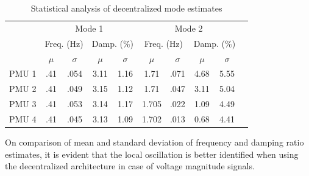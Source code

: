 \documentclass[conference]{IEEEtran}
\renewcommand\footnoterule{\vspace*{-3pt}%
     \hrule width 2in height 0.4pt
     \vspace*{2.6pt}}
\begin{document}
\begin{table}[!b]
\renewcommand{\arraystretch}{1.2}
%
\caption{Statistical analysis of  decentralized mode estimates}
\label{tab:result_decentral}
\noindent
\centering
    \begin{minipage}{\linewidth} %
    \renewcommand\footnoterule{\vspace*{-5pt}} %
    \begin{center}
        \begin{tabular}{c c c c c c c c c c}
            \toprule
            \multirow{2}{*}{} & \multicolumn{4}{c}{Mode 1 }& \multicolumn{4}{c}{Mode 2}\\
            \cline{2-9}
            \multirow{2}{*}{PMU ID} & \multicolumn{2}{c}{Freq. (Hz)}& \multicolumn{2}{c}{Damp. (\%)} & \multicolumn{2}{c}{Freq. (Hz)}& \multicolumn{2}{c}{Damp. (\%)}\\
            \cline{2-9}
             & $\mu $ & $\sigma $  & $\mu $ & $\sigma $ & $\mu $ & $\sigma $ & $\mu $ & $\sigma $\\
            \midrule
            PMU 1 & .41  & .054 & 3.11 & 1.16 & 1.71 & .071 & 4.68 & 5.55\\
            PMU 2 & .41  & .049 & 3.15 & 1.12 & 1.71 & .047 & 3.11 & 5.04\\
            PMU 3 & .41  & .053 & 3.14 & 1.17 & 1.705 &.022 & 1.09 & 4.49\\
            PMU 4 & .41  & .045 & 3.13 & 1.09 & 1.702 & .013 & 0.68 & 4.41\\
            
            \bottomrule
        \end{tabular}
        \end{center}
    \end{minipage}
\end{table}


On comparison of mean and standard deviation of frequency and damping ratio estimates, it is evident that the local oscillation is better identified when using the decentralized architecture in case of voltage magnitude signals.    
\end{document}

